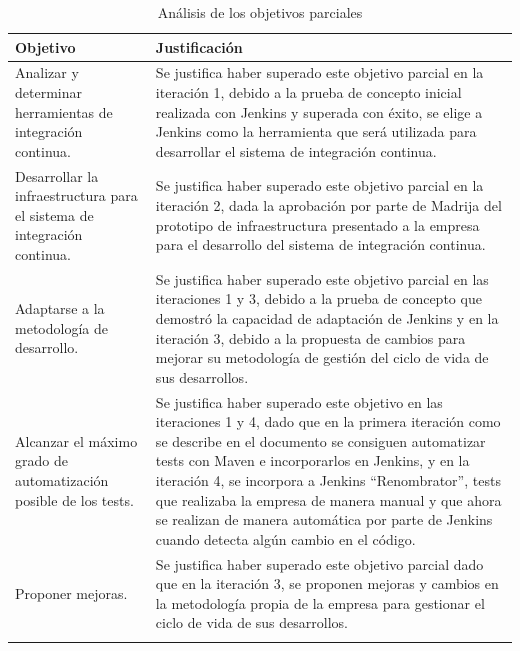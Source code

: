 \newpage

\begin{center}
\begin{longtable}{p{} p{}}
\hline \hline
  \textbf{Objetivo} & \textbf{Justificación} \\
    \hline \hline
    Analizar y determinar herramientas de integración continua. & Se justifica haber superado este objetivo parcial en la iteración 1, debido a la prueba de concepto inicial realizada con Jenkins y superada con éxito, se elige a Jenkins como la herramienta que será utilizada para desarrollar el sistema de integración continua.\\
    \hline\hline
    Desarrollar la infraestructura para el sistema de integración continua. & Se justifica haber superado este objetivo parcial en la iteración 2, dada la aprobación por parte de \ac{Madrija} del prototipo de infraestructura presentado a la empresa para el desarrollo del sistema de integración continua.\\
    \hline \hline
    Adaptarse a la metodología de desarrollo. & Se justifica haber superado este objetivo parcial en las iteraciones 1 y 3, debido a la prueba de concepto que demostró la capacidad de adaptación de Jenkins y en la iteración 3, debido a la propuesta de cambios para mejorar su metodología de gestión del ciclo de vida de sus desarrollos.\\
    \hline \hline
    Alcanzar el máximo grado de automatización posible de los tests. & Se justifica haber superado este objetivo en las iteraciones 1 y 4, dado que en la primera iteración como se describe en el documento se consiguen automatizar tests con Maven e incorporarlos en Jenkins, y en la iteración 4, se incorpora a Jenkins ``Renombrator'', tests que realizaba la empresa de manera manual y que ahora se realizan de manera automática por parte de Jenkins cuando detecta algún cambio en el código.\\
    \hline \hline
    Proponer mejoras. & Se justifica haber superado este objetivo parcial dado que en la iteración 3, se proponen mejoras y cambios en la metodología propia de la empresa para gestionar el ciclo de vida de sus desarrollos.\\
    \hline \hline
      \rowcolor{white}\caption{Análisis de los objetivos parciales}
\end{longtable}
\end{center}

\newpage

